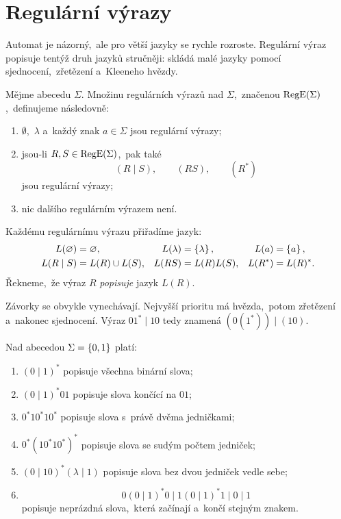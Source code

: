 \section{Regulární výrazy}\label{sec:regex}

Automat je názorný,~ale pro větší jazyky se rychle rozroste. Regulární výraz popisuje tentýž druh jazyků stručněji: skládá malé jazyky pomocí sjednocení,~zřetězení a~Kleeneho hvězdy.

\begin{definition}
    Mějme abecedu $\Sigma$. Množinu regulárních výrazů nad $\Sigma$,~značenou $\operatorname{RegE}(\Sigma)$,~definujeme následovně:
    \begin{enumerate}
        \item $\emptyset$,~$\lambda$ a~každý znak $a\in\Sigma$ jsou regulární výrazy;
        \item jsou-li $R,S\in\operatorname{RegE}(\Sigma)$,~pak také
        \[
            (R\mid S),\qquad (RS),\qquad (R^*)
        \]
        jsou regulární výrazy;
        \item nic dalšího regulárním výrazem není.
    \end{enumerate}
\end{definition}

Každému regulárnímu výrazu přiřadíme jazyk:
\[
\begin{aligned}
    L(\varnothing)&=\varnothing, &
    L(\lambda)&=\left\{\lambda\right\}, &
    L(a)&=\left\{a\right\},\\
    L(R\mid S)&=L(R)\cup L(S),&
    L(RS)&=L(R)L(S),&
    L(R^*)&=L(R)^*.
\end{aligned}
\]
Řekneme,~že výraz $R$ \emph{popisuje} jazyk $L(R)$.

Závorky se obvykle vynechávají. Nejvyšší prioritu má hvězda,~potom zřetězení a~nakonec sjednocení. Výraz $01^*\mid 10$ tedy znamená $(0(1^*))\mid(10)$.

\begin{example}
    Nad abecedou $\Sigma=\left\{0,1\right\}$ platí:
    \begin{enumerate}
        \item $(0\mid1)^*$ popisuje všechna binární slova;
        \item $(0\mid1)^*01$ popisuje slova končící na $01$;
        \item $0^*10^*10^*$ popisuje slova s~právě dvěma jedničkami;
        \item $0^*(10^*10^*)^*$ popisuje slova se sudým počtem jedniček;
        \item $(0\mid10)^*(\lambda\mid1)$ popisuje slova bez dvou jedniček vedle sebe;
        \item
        \[
            0(0\mid1)^*0\mid1(0\mid1)^*1\mid0\mid1
        \]
        popisuje neprázdná slova,~která začínají a~končí stejným znakem.
    \end{enumerate}
\end{example}

